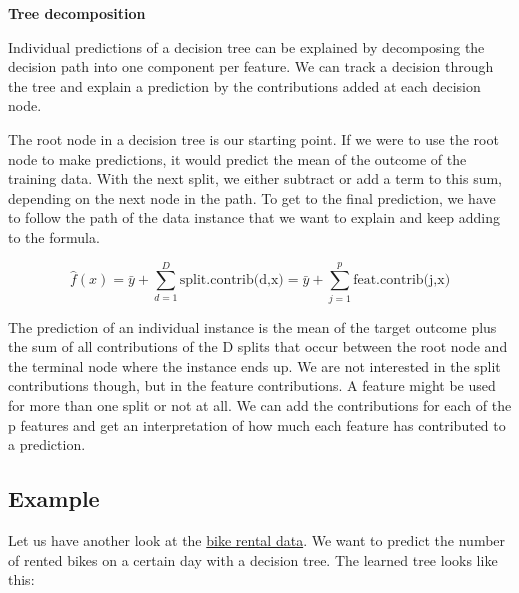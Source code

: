 \documentclass[12pt,]{krantz}
\begin{document}
\textbf{Tree decomposition}

Individual predictions of a decision tree can be explained by
decomposing the decision path into one component per feature. We can
track a decision through the tree and explain a prediction by the
contributions added at each decision node.

The root node in a decision tree is our starting point. If we were to
use the root node to make predictions, it would predict the mean of the
outcome of the training data. With the next split, we either subtract or
add a term to this sum, depending on the next node in the path. To get
to the final prediction, we have to follow the path of the data instance
that we want to explain and keep adding to the formula.

\[\hat{f}(x)=\bar{y}+\sum_{d=1}^D\text{split.contrib(d,x)}=\bar{y}+\sum_{j=1}^p\text{feat.contrib(j,x)}\]

The prediction of an individual instance is the mean of the target
outcome plus the sum of all contributions of the D splits that occur
between the root node and the terminal node where the instance ends up.
We are not interested in the split contributions though, but in the
feature contributions. A feature might be used for more than one split
or not at all. We can add the contributions for each of the p features
and get an interpretation of how much each feature has contributed to a
prediction.

\subsection{Example}\label{example-2}

Let us have another look at the \protect\hyperlink{bike-data}{bike
rental data}. We want to predict the number of rented bikes on a certain
day with a decision tree. The learned tree looks like this:
\end{document}
